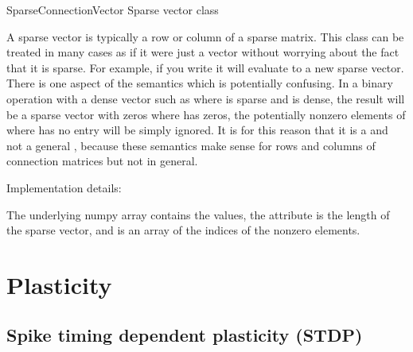 \documentclass[letterpaper,10pt,english]{manual}
\begin{document}
\hypertarget{brian.SparseConnectionVector}{}\begin{classdesc}{SparseConnectionVector}{}
Sparse vector class

A sparse vector is typically a row or column of a sparse matrix. This
class can be treated in many cases as if it were just a vector without
worrying about the fact that it is sparse. For example, if you write
 it will evaluate to a new sparse vector. There is one aspect
of the semantics which is potentially confusing. In a binary operation
with a dense vector such as  where  is sparse and 
is dense, the result will be a sparse vector with zeros where 
has zeros, the potentially nonzero elements of  where  has
no entry will be simply ignored. It is for this reason that it is a
 and not a general , because
these semantics make sense for rows and columns of connection matrices
but not in general.

Implementation details:

The underlying numpy array contains the values, the attribute  is
the length of the sparse vector, and  is an array of the indices
of the nonzero elements.
\end{classdesc}

\resetcurrentobjects
\hypertarget{--doc-reference-plasticity}{}

\section{Plasticity}


\subsection{Spike timing dependent plasticity (STDP)}
\end{document}
